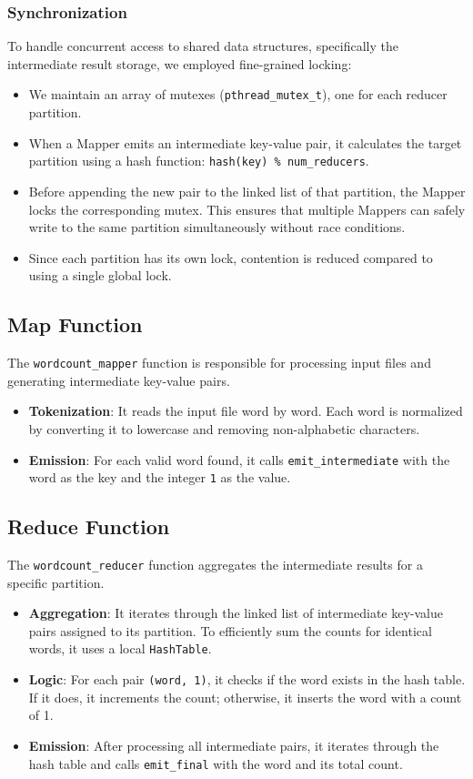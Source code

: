\documentclass[a4paper,12pt]{article}
\begin{document}
\subsubsection{Synchronization}
To handle concurrent access to shared data structures, specifically the intermediate result storage, we employed fine-grained locking:
\begin{itemize}
    \item We maintain an array of mutexes (\texttt{pthread\_mutex\_t}), one for each reducer partition.
    \item When a Mapper emits an intermediate key-value pair, it calculates the target partition using a hash function: \texttt{hash(key) \% num\_reducers}.
    \item Before appending the new pair to the linked list of that partition, the Mapper locks the corresponding mutex. This ensures that multiple Mappers can safely write to the same partition simultaneously without race conditions.
    \item Since each partition has its own lock, contention is reduced compared to using a single global lock.
\end{itemize}

\subsection{Map Function}
The \texttt{wordcount\_mapper} function is responsible for processing input files and generating intermediate key-value pairs.
\begin{itemize}
    \item \textbf{Tokenization}: It reads the input file word by word. Each word is normalized by converting it to lowercase and removing non-alphabetic characters.
    \item \textbf{Emission}: For each valid word found, it calls \texttt{emit\_intermediate} with the word as the key and the integer \texttt{1} as the value.
\end{itemize}

\subsection{Reduce Function}
The \texttt{wordcount\_reducer} function aggregates the intermediate results for a specific partition.
\begin{itemize}
    \item \textbf{Aggregation}: It iterates through the linked list of intermediate key-value pairs assigned to its partition. To efficiently sum the counts for identical words, it uses a local \texttt{HashTable}.
    \item \textbf{Logic}: For each pair \texttt{(word, 1)}, it checks if the word exists in the hash table. If it does, it increments the count; otherwise, it inserts the word with a count of 1.
    \item \textbf{Emission}: After processing all intermediate pairs, it iterates through the hash table and calls \texttt{emit\_final} with the word and its total count.
\end{itemize}
\end{document}
